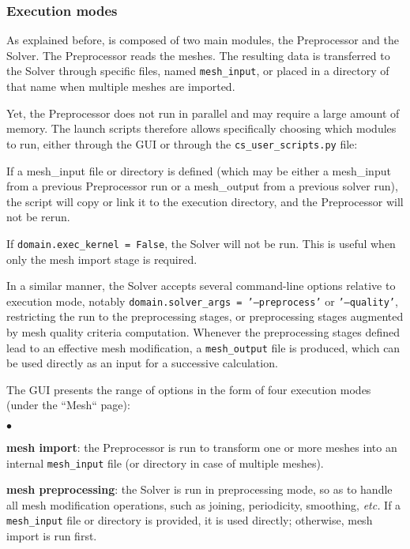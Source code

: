 {{{{{%
\subsubsection{Execution modes}
\label{sec:prg_executionmodes}%
As explained before, \CS is composed of two main modules, the Preprocessor and the
Solver. The Preprocessor reads the meshes.
The resulting data is transferred to the Solver through specific
files, named \texttt{mesh\_input}, or placed in a directory of that name when
multiple meshes are imported.

Yet, the Preprocessor does not run in parallel and may require a
large amount of memory. The launch scripts therefore allows specifically
choosing which modules to run, either through the GUI or through the
\texttt{cs\_user\_scripts.py} file:

\hspace*{0.5cm} If a {mesh\_input} file or directory is defined (which may be
either a {mesh\_input} from a previous Preprocessor run or a {mesh\_output}
from a previous solver run), the script will copy or link it to
the execution directory, and the Preprocessor will not be rerun.

\hspace*{0.5cm} If \texttt{domain.exec\_kernel = False}, the Solver will not
be run. This is useful when only the mesh import stage is required.

In a similar manner, the Solver accepts several command-line options relative to execution mode, notably \texttt{domain.solver\_args = '--preprocess'} or \texttt{'--quality'}, restricting the run to the preprocessing stages, or preprocessing stages augmented by mesh quality criteria computation. Whenever the preprocessing stages defined lead to an effective mesh modification, a \texttt{mesh\_output} file is produced, which can be used directly as an input for a successive calculation.

The GUI presents the range of options in the form of four execution modes (under the ``Mesh`` page):

\begin{list}{$\bullet$}{}

\item {\bf mesh import}: the Preprocessor is run to transform one or more meshes into an internal \texttt{mesh\_input} file (or directory in case of multiple meshes).

\item {\bf mesh preprocessing}: the Solver is run in preprocessing mode, so as to handle all mesh modification operations, such as joining, periodicity, smoothing, \emph{etc.} If a \texttt{mesh\_input} file or directory is provided, it is used directly; otherwise, mesh import is run first.


\end{list}}}}}}
